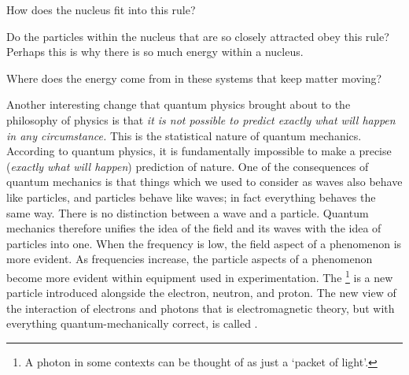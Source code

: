 \begin{questions}
	\item How does the nucleus fit into this rule?
	\item Do the particles within the nucleus that are so closely attracted obey this rule? Perhaps this is why there is so much energy within a nucleus.
	\item Where does the energy come from in these systems that keep matter moving?
\end{questions}

Another interesting change that quantum physics brought about to the philosophy of physics is that \textit{it is not possible to predict exactly what will happen in any circumstance.} This is the statistical nature of quantum mechanics. According to quantum physics, it is fundamentally impossible to make a precise (\textit{exactly what will happen}) prediction of nature. One of the consequences of quantum mechanics is that things which we used to consider as waves also behave like particles, and particles behave like waves; in fact everything behaves the same way. There is no distinction between a wave and a particle. Quantum mechanics therefore unifies the idea of the field and its waves with the idea of particles into one. When the frequency is low, the field aspect of a phenomenon is more evident. As frequencies increase, the particle aspects of a phenomenon become more evident within equipment used in experimentation. The \footnote{A photon in some contexts can be thought of as just a `packet of light'.} is a new particle introduced alongside the electron, neutron, and proton. The new view of the interaction of electrons and photons that is electromagnetic theory, but with everything quantum-mechanically correct, is called .
